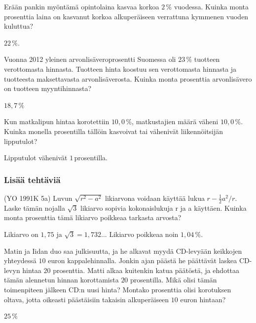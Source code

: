 \begin{tehtavasivu}
\begin{tehtava}
    Erään pankin myöntämä opintolaina kasvaa korkoa $2\,\%$ vuodessa. Kuinka monta prosenttia laina on kasvanut korkoa alkuperäiseen verrattuna kymmenen vuoden kuluttua?
    \begin{vastaus}
        $22\,\%$.
    \end{vastaus}
\end{tehtava}

\begin{tehtava}
    Vuonna 2012 yleinen arvonlisäveroprosentti Suomessa oli $23\,\%$ tuotteen
    verottomasta hinnasta. Tuotteen hinta koostuu sen verottomasta hinnasta 
    ja tuotteesta maksettavasta arvonlisäverosta. Kuinka monta 
    prosenttia arvonlisävero on tuotteen myyntihinnasta?
    \begin{vastaus}
        $18,7\,\%$
    \end{vastaus}
\end{tehtava}

\begin{tehtava}
    Kun matkalipun hintaa korotettiin $10,0\,\%$, matkustajien määrä väheni $10,0\,\%$.
    Kuinka monella prosentilla tällöin kasvoivat tai vähenivät liikennöitsijän 
    lipputulot?
    \begin{vastaus}
        Lipputulot vähenivät $1$\,prosentilla.
    \end{vastaus}
\end{tehtava}

\subsubsection*{Lisää tehtäviä}

\begin{tehtava}
    (YO 1991K 5a) Luvun $\sqrt{r^2-a^2}$ likiarvona voidaan käyttää lukua $r-{\frac{1}{2}a^2}/r$. Laske tämän nojalla $\sqrt{3}$ likiarvo sopivia kokonaislukuja r ja a käyttäen. Kuinka monta prosenttia tämä likiarvo poikkeaa tarkasta arvosta?
    \begin{vastaus}
        Likiarvo on $1,75$ ja $\sqrt{3}=1,732...$ Likiarvo poikkeaa noin $1,04\,\%$.
    \end{vastaus}
\end{tehtava}

\begin{tehtava}
    Matin ja Iidan duo saa julkisuutta, ja he alkavat myydä CD-levyään keikkojen yhteydessä $10$ euron kappalehinnalla. Jonkin ajan päästä he päättävät laskea CD-levyn hintaa $20$ prosenttia. Matti alkaa kuitenkin katua päätöstä, ja ehdottaa tämän alennetun hinnan korottamista $20$ prosentilla. Mikä olisi tämän toimenpiteen jälkeen CD:n uusi hinta? Montako prosenttia olisi korotuksen oltava, jotta oikeasti päästäisiin takaisin alkuperäiseen $10$ euron hintaan?
    \begin{vastaus}
        $25\,\%$
    \end{vastaus}
\end{tehtava}



\end{tehtavasivu}
